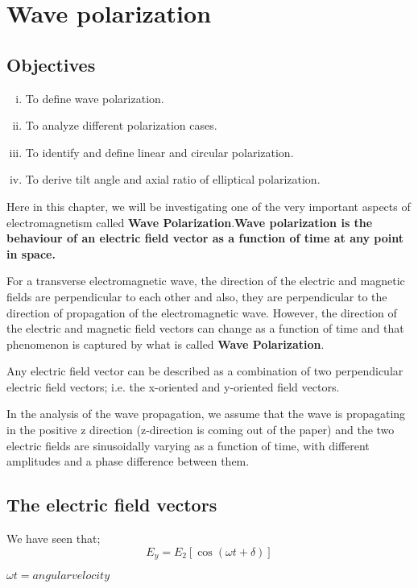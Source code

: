 \chapter{Wave polarization}\label{lec:lec23}
\section{Objectives}
\begin{enumerate}[(i)]
\item To define wave polarization.
\item To analyze different polarization cases.
\item To identify and define linear and circular polarization.
\item To derive tilt angle and axial ratio of elliptical polarization.
\end{enumerate}

Here in this chapter, we will be investigating one of the very important aspects of electromagnetism called \textbf{Wave Polarization}.\textbf{Wave polarization is the behaviour of an electric field vector as a function of time at any point in space.}

For a transverse electromagnetic wave, the direction of the electric and magnetic fields are perpendicular to each other and also, they are perpendicular to the direction of propagation of the electromagnetic wave. However, the direction of the electric and magnetic field vectors can change as a function of time and that phenomenon is captured by what is called \textbf{Wave Polarization}.

Any electric field vector can be described as a combination of two perpendicular electric field vectors; i.e. the x-oriented and y-oriented field vectors. 

In the analysis of the wave propagation, we assume that the wave is propagating in the positive z direction (z-direction is coming out of the paper) and the two electric fields are sinusoidally varying as a function of time, with different amplitudes and a phase difference between them.	

\section{The electric field vectors} 
We have seen that;
\begin{equation}
E_y = E_2 [\cos(\omega t + \delta)]
\end{equation}


$\omega t =angular  velocity$\\

